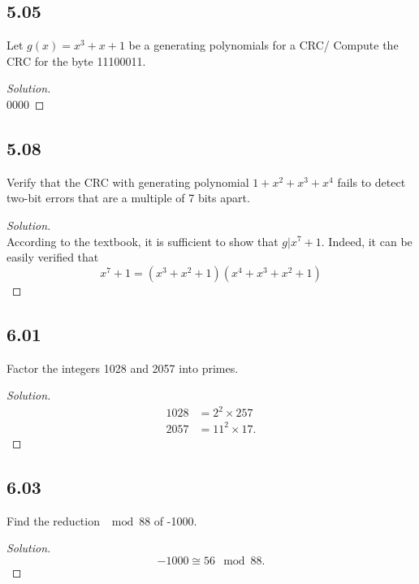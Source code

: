 \documentclass[]{article}
\newcommand\<{\langle}
\renewcommand\>{\rangle}
\newenvironment{solution}
{
	\begin{proof}[Solution] \text{ }
		\\
	}
	{
	\end{proof}
}
\begin{document}
\subsection*{5.05} Let $g(x) = x^3 + x + 1$ be a generating polynomials for a CRC/ Compute the CRC for the byte 11100011.
\begin{solution}
	0000
\end{solution}

\subsection*{5.08} Verify that the CRC with generating polynomial $1 + x^2 + x^3 + x^4$ fails to detect two-bit errors that are a multiple of 7 bits apart.
\begin{solution}
	According to the textbook, it is sufficient to show that $g | x^7 + 1$. Indeed, it can be easily verified that
	$$
		x^7 + 1 = (x^3 + x^2 + 1)(x^4 + x^3 + x^2 + 1)
	$$
\end{solution}

\subsection*{6.01} Factor the integers 1028 and 2057 into primes.
\begin{solution}
	\begin{align*}
		1028 &= 2^2 \times 257 \\
		2057 &= 11^2 \times 17.
	\end{align*}
\end{solution}

\subsection*{6.03} Find the reduction $\mod 88$ of -1000.
\begin{solution}
	$$
		-1000 \cong 56 \mod 88.
	$$
\end{solution}
\end{document}
